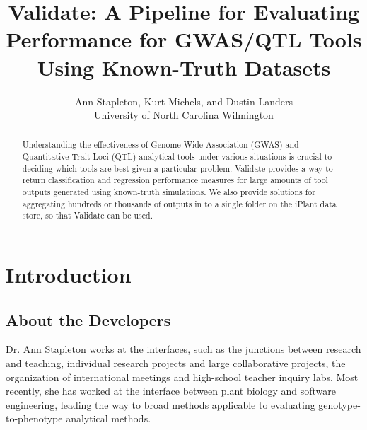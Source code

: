 \documentclass[twoside,a4paper]{refart}
\title{Validate: A Pipeline for Evaluating Performance for GWAS/QTL Tools Using Known-Truth Datasets}
\author{Ann Stapleton, Kurt Michels, and Dustin Landers \\
University of North Carolina Wilmington \\
}
\date{}
\begin{document}
\maketitle

\begin{abstract}
        Understanding the effectiveness of Genome-Wide Association (GWAS) and Quantitative Trait Loci (QTL) analytical tools under various situations is crucial to deciding which tools are best given a particular problem. Validate provides a way to return classification and regression performance measures for large amounts of tool outputs generated using known-truth simulations. We also provide solutions for aggregating hundreds or thousands of outputs in to a single folder on the iPlant data store, so that Validate can be used.\end{abstract}

\tableofcontents

\newpage


\begin{center}
\end{center}

\section{Introduction}

\subsection{About the Developers}

Dr. Ann Stapleton works at the interfaces, such as the junctions between research and teaching, individual research projects and large collaborative projects, the organization of international meetings and high-school teacher inquiry labs. Most recently, she has worked at the interface between plant biology and software engineering, leading the way to broad methods applicable to evaluating genotype-to-phenotype analytical methods.
\end{document}
